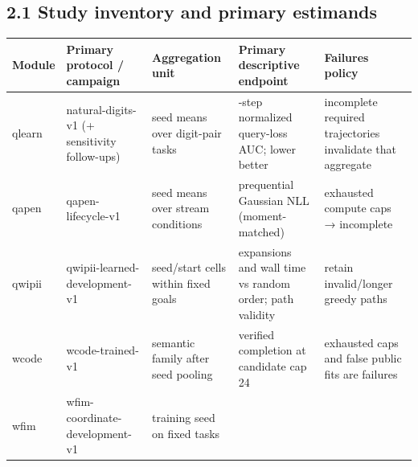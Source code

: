 \documentclass[
  11pt,
  a4paper,
]{article}
\newcounter{none} %
\begin{document}
\subsection{2.1 Study inventory and primary
estimands}\label{study-inventory-and-primary-estimands}

{\def\LTcaptype{none} %
\begin{longtable}[]{@{}
  >{\raggedright\arraybackslash}p{}
  >{\raggedright\arraybackslash}p{}
  >{\raggedright\arraybackslash}p{}
  >{\raggedright\arraybackslash}p{}
  >{\raggedright\arraybackslash}p{}@{}}
\toprule\noalign{}
\begin{minipage}[b]{\linewidth}\raggedright
Module
\end{minipage} & \begin{minipage}[b]{\linewidth}\raggedright
Primary protocol / campaign
\end{minipage} & \begin{minipage}[b]{\linewidth}\raggedright
Aggregation unit
\end{minipage} & \begin{minipage}[b]{\linewidth}\raggedright
Primary descriptive endpoint
\end{minipage} & \begin{minipage}[b]{\linewidth}\raggedright
Failures policy
\end{minipage} \\
\midrule\noalign{}
\endhead
\bottomrule\noalign{}
\endlastfoot
qlearn & natural-digits-v1 (+ sensitivity follow-ups) & seed means over
digit-pair tasks & 32-step normalized query-loss AUC; lower better &
incomplete required trajectories invalidate that aggregate \\
qapen & qapen-lifecycle-v1 & seed means over stream conditions &
prequential Gaussian NLL (moment-matched) & exhausted compute caps →
incomplete \\
qwipii & qwipii-learned-development-v1 & seed/start cells within fixed
goals & expansions and wall time vs random order; path validity & retain
invalid/longer greedy paths \\
wcode & wcode-trained-v1 & semantic family after seed pooling & verified
completion at candidate cap 24 & exhausted caps and false public fits
are failures \\
wfim & wfim-coordinate-development-v1 & training seed on fixed tasks &

\end{longtable}}
\end{document}
